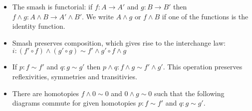 \documentclass{article}
\newcommand{\pmap}{\to}
\renewcommand{\smash}{\wedge}
\renewcommand{\o}{\ensuremath{\circ}}
\begin{document}
\begin{lem}\mbox{}\label{lem:smash-general}
  \begin{itemize}
  \item The smash is functorial: if $f:A\pmap A'$ and $g:B\pmap B'$ then
    $f\smash g:A\smash B\pmap A'\smash B'$. We write $A\smash g$ or $f\smash B$ if one of the
    functions is the identity function.
  \item Smash preserves composition, which gives rise to the interchange law:
    $i:(f' \o f)\smash (g' \o g) \sim f' \smash g' \o f \smash g$
  \item If $p:f\sim f'$ and $q:g\sim g'$ then $p\smash q:f\smash g\sim f'\smash g'$. This operation
    preserves reflexivities, symmetries and transitivies.
  \item There are homotopies $f\smash0\sim0$ and $0\smash g\sim 0$ such that the following diagrams
    commute for given homotopies $p : f\sim f'$ and $q : g\sim g'$.
    \begin{center}
\qquad
{}
\end{center}

  \end{itemize}
\end{lem}
\end{document}
